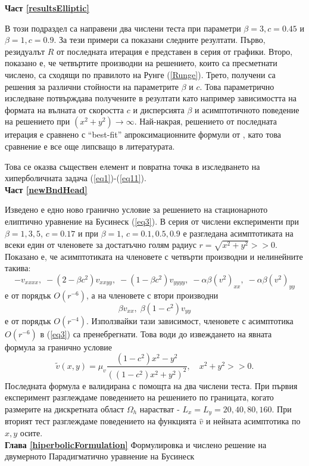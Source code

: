 \documentclass[a5paper]{article}
\newcommand{\be}{\begin{equation}}
\newcommand{\ee}{\end{equation}}
\newcommand{\rf}[1]{(\ref{#1})}
\theoremstyle{remark}
\begin{document}
\begin{normalsize}
\textbf{Част \ref{resultsElliptic}}

В този подраздел са направени два числени теста при параметри $\beta = 3, c=0.45$ и $\beta = 1, c=0.9$. За тези примери са показани следните резултати. Първо, резидуалът $R$ от последната итерация е представен в серия от графики. Второ, показано е, че четвъртите производни на решението, които са пресметнати числено, са сходящи по правилото на Рунге \rf{Runge}. Трето, получени са решения за различни стойности на параметрите $\beta$ и $c$. Това параметрично изследване потвърждава получените в \cite{ref116,ref15} резултати като например зависимостта на формата на вълната от скоростта $c$ и дисперсията $\beta$ и асимптотичното поведение на решението при $(x^2 + y^2) \rightarrow \infty$. Най-накрая, решението от последната итерация е сравнено с ``best-fit'' апроксимационните формули от \cite{ref15}, като това сравнение е все още липсващо в литературата. 

Това се оказва съществен елемент и повратна точка в изследването на хиперболичната задача \rf{eq1}-\rf{eq11}. \\

\textbf{Част \ref{newBndHead}}

Изведено е едно ново гранично условие за решението на стационарното елиптично уравнение на Бусинеск \rf{eq3}. В серия от числени експерименти при $\beta=1,3,5$, $c=0.17$ и при $\beta=1$, $c=0.1, 0.5, 0.9$ е разгледана асимптотиката на всеки един от членовете за достатъчно голям радиус $r=\sqrt{x^2 + y^2} >> 0$. Показано е, че асимптотиката на членовете с четвърти производни и нелинейните такива: 
$$- v_{xxxx}, \;  - (2-\beta c^2)v_{xxyy},  \;  - (1-\beta c^2)v_{yyyy}, \;  - \alpha \beta (v^2)_{xx}, \; - \alpha \beta (v^2)_{yy}$$
е от порядък $O(r^{-6})$, а на членовете с втори производни 
$$\beta v_{xx}, \; \beta (1-c^2) v_{yy}$$
 е от порядък $O(r^{-4})$. Използвайки тази зависимост, членовете с асимптотика $O(r^{-6})$ в \rf{eq3} са пренебрегнати. Това води до извеждането на явната формула за гранично условие
\be
\tilde v(x, y) = \mu_v \frac{ (1-c^2) x^2 - y^2 }{ ((1-c^2) x^2 + y^2)^2 }, \quad x^2+y^2 >> 0.
\ee
Последната формула е валидирана с помощта на два числени теста. При първия експеримент разглеждаме поведението на решението по границата, когато размерите на дискретната област $\Omega_h$ нарастват - $L_x = L_y = 20, 40, 80, 160$. При вторият тест разглеждаме поведението на функцията $\widehat v$ и нейната асимптотика по $x,y$ осите.\\

\textbf{Глава \ref{hiperbolicFormulation}} Формулировка и числено решение на двумерното Парадигматично уравнение на Бусинеск


\end{normalsize}
\end{document}
